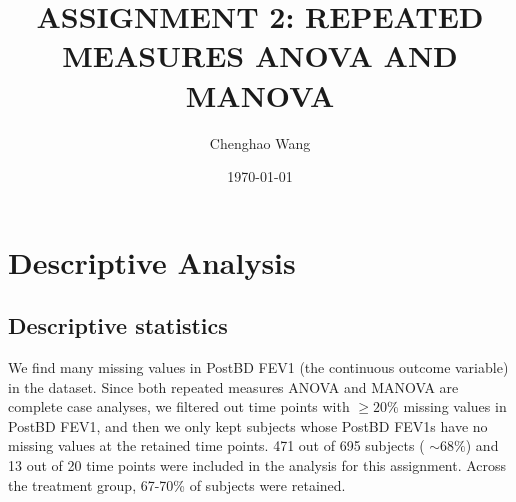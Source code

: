 \documentclass[12pt]{article}
\title{\Large\bfseries ASSIGNMENT 2: REPEATED MEASURES ANOVA AND
MANOVA}
\author{Chenghao Wang}
\date{\today}
\begin{document}
\maketitle

\section{Descriptive Analysis}
\subsection{Descriptive statistics}\label{subsec:descriptive-statistics}
We find many missing values in PostBD FEV1 (the continuous outcome variable) 
in the dataset. Since both repeated measures ANOVA and MANOVA are complete case analyses, 
we filtered out time points with $\ge 20\%$ missing values in PostBD FEV1, and then
we only kept subjects whose PostBD FEV1s have no missing values at the retained time points.
471 out of 695 subjects ( $\sim 68\%$) and
13 out of 20 time points were included in the analysis for this assignment.
Across the treatment group, 67-70\% of subjects were retained.
\end{document}
